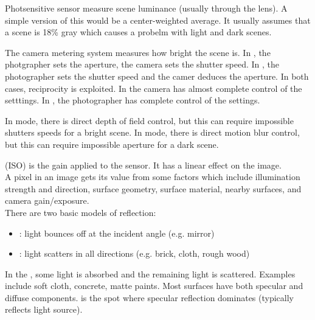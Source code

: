 \documentclass{article}
\begin{document}
\begin{definition}[Metering]
  Photsensitive sensor measure scene luminance (usually through the lens). A simple version of this would be a center-weighted average. It usually assumes that a scene is 18\% gray which causes a probelm with light and dark scenes. 
\end{definition}

The camera metering system measures how bright the scene is. In , the photgrapher sets the aperture, the camera sets the shutter speed. In , the photographer sets the shutter speed and the camer deduces the aperture. In both cases, reciprocity is exploited. In  the camera has almost complete control of the setttings. In , the photographer has complete control of the settings. 

\begin{remark}
  In  mode, there is direct depth of field control, but this can require impossible shutters speeds for a bright scene. In  mode, there is direct motion blur control, but this can require impossible aperture for a dark scene. 
\end{remark}

 (ISO) is the gain applied to the sensor. It has a linear effect on the image. \\ 

A pixel in an image gets its value from some factors which include illumination strength and direction, surface geometry, surface material, nearby surfaces, and camera gain/exposure. \\

There are two basic models of reflection: 
\begin{itemize}
  \item {}: light bounces off at the incident angle (e.g. mirror)
  \item {}: light scatters in all directions (e.g. brick, cloth, rough wood)
\end{itemize}

In the , some light is absorbed and the remaining light is scattered. Examples include soft cloth, concrete, matte paints. Most surfaces have both specular and diffuse components.  is the spot where specular reflection dominates (typically reflects light source). \\ 
\end{document}
